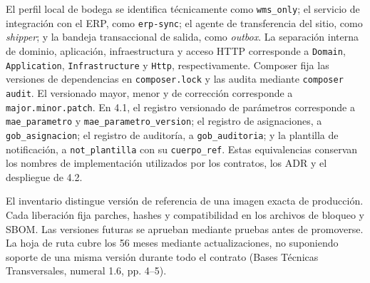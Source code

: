 El perfil local de bodega se identifica técnicamente como \texttt{wms\_only}; el servicio de integración con el ERP, como \texttt{erp-sync}; el agente de transferencia del sitio, como \textit{shipper}; y la bandeja transaccional de salida, como \textit{outbox}. La separación interna de dominio, aplicación, infraestructura y acceso HTTP corresponde a \texttt{Domain}, \texttt{Application}, \texttt{Infrastructure} y \texttt{Http}, respectivamente. Composer fija las versiones de dependencias en \texttt{composer.lock} y las audita mediante \texttt{composer audit}. El versionado mayor, menor y de corrección corresponde a \texttt{major.minor.patch}. En 4.1, el registro versionado de parámetros corresponde a \texttt{mae\_parametro} y \texttt{mae\_parametro\_version}; el registro de asignaciones, a \texttt{gob\_asignacion}; el registro de auditoría, a \texttt{gob\_auditoria}; y la plantilla de notificación, a \texttt{not\_plantilla} con su \texttt{cuerpo\_ref}. Estas equivalencias conservan los nombres de implementación utilizados por los contratos, los ADR y el despliegue de 4.2.

El inventario distingue versión de referencia de una imagen exacta de producción. Cada liberación fija parches, hashes y compatibilidad en los archivos de bloqueo y SBOM. Las versiones futuras se aprueban mediante pruebas antes de promoverse. La hoja de ruta cubre los 56 meses mediante actualizaciones, no suponiendo soporte de una misma versión durante todo el contrato (Bases Técnicas Transversales, numeral 1.6, pp. 4--5).

